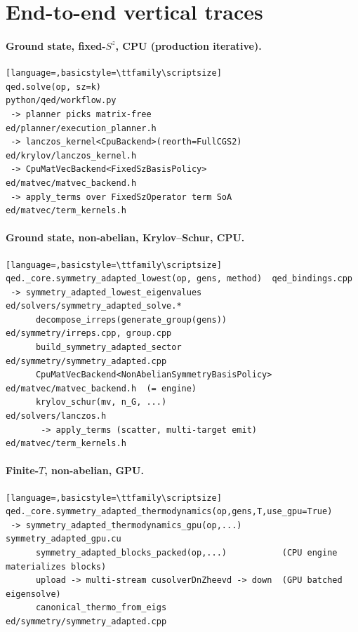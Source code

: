 \documentclass[11pt]{article}
\begin{document}
\section{End-to-end vertical traces}

\paragraph{Ground state, fixed-$S^z$, CPU (production iterative).}
\begin{lstlisting}[language=,basicstyle=\ttfamily\scriptsize]
qed.solve(op, sz=k)                                  python/qed/workflow.py
 -> planner picks matrix-free                        ed/planner/execution_planner.h
 -> lanczos_kernel<CpuBackend>(reorth=FullCGS2)       ed/krylov/lanczos_kernel.h
 -> CpuMatVecBackend<FixedSzBasisPolicy>              ed/matvec/matvec_backend.h
 -> apply_terms over FixedSzOperator term SoA         ed/matvec/term_kernels.h
\end{lstlisting}

\paragraph{Ground state, non-abelian, Krylov--Schur, CPU.}
\begin{lstlisting}[language=,basicstyle=\ttfamily\scriptsize]
qed._core.symmetry_adapted_lowest(op, gens, method)  qed_bindings.cpp
 -> symmetry_adapted_lowest_eigenvalues               ed/solvers/symmetry_adapted_solve.*
      decompose_irreps(generate_group(gens))          ed/symmetry/irreps.cpp, group.cpp
      build_symmetry_adapted_sector                   ed/symmetry/symmetry_adapted.cpp
      CpuMatVecBackend<NonAbelianSymmetryBasisPolicy>  ed/matvec/matvec_backend.h  (= engine)
      krylov_schur(mv, n_G, ...)                       ed/solvers/lanczos.h
       -> apply_terms (scatter, multi-target emit)     ed/matvec/term_kernels.h
\end{lstlisting}

\paragraph{Finite-$T$, non-abelian, GPU.}
\begin{lstlisting}[language=,basicstyle=\ttfamily\scriptsize]
qed._core.symmetry_adapted_thermodynamics(op,gens,T,use_gpu=True)
 -> symmetry_adapted_thermodynamics_gpu(op,...)        symmetry_adapted_gpu.cu
      symmetry_adapted_blocks_packed(op,...)           (CPU engine materializes blocks)
      upload -> multi-stream cusolverDnZheevd -> down  (GPU batched eigensolve)
      canonical_thermo_from_eigs                       ed/symmetry/symmetry_adapted.cpp
\end{lstlisting}
\end{document}
